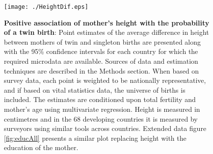 \documentclass{nature}
\begin{document}
\begin{linenumbers}
\begin{spacing}{1}
\begin{figure}[htpb!]
  \texttt{[image: ./HeightDif.eps]}
\vspace{5mm}
\caption{\textbf{Positive association of mother's height with the probability of a twin birth}: {\footnotesize Point estimates of the average difference in height between mothers of twin and singleton births are presented along with the 95\% confidence intervals for each country for which the required microdata are available. Sources of data and estimation techniques are described in the Methods section. When based on survey data, each point is weighted to be nationally representative, and if based on vital statistics data, the universe of births is included. The estimates are conditioned upon total fertility and mother's age using multivariate regression. Height is measured in centimetres and in the 68 developing countries it is measured by surveyors using similar tools across countries. Extended data figure \ref{fig:educAll} presents a similar plot replacing height with the education of the mother.}}
\label{fig:countryEsts}
\end{figure}



\end{spacing}
\end{linenumbers}
\end{document}
